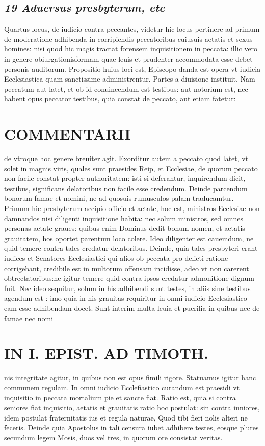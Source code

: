 \documentclass{article}
\begin{document}
\begin{pages}
\subsection*{\textit{19 Aduersus presbyterum, etc }}\pstart Quartus locus, de iudicio contra peccantes, videtur hic locus pertinere ad primum de moderatione adhibenda in corripiendis peccatoribus  cuiusuis aetatis et sexus homines: nisi quod hic magis tractat forensem inquisitionem in peccata: illic vero in genere obiurgationisformam quae leuis et prudenter accommodata esse debet personis auditorum.  \pend\pstart Propositio huius loci est, Episcopo danda est opera vt iudicia Ecclesiastica quam sanctissime administrentur.  \pend\pstart Partes a diuisione instituit. Nam peccatum aut latet, et ob id conuincendum est testibus: aut notorium est, nec habent opus peccator testibus, quia constat de peccato, aut etiam fatetur:  \pend
\section*{COMMENTARII }
\marginpar{[ p.134 ]}\pstart de vtroque hoc genere breuiter agit.  \pend\pstart Exorditur autem a peccato quod latet, vt solet in magnis viris, quales sunt praesides Reip, et Ecclesiae, de quorum peccato non facile constat propter authoritatem: isti si deferantur, inquirendum dicit, testibus, significans delatoribus non facile esse credendum. Deinde parcendum bonorum famae et nomini, ne ad quosuis rumusculos palam traducamtur. Primum hic presbyterum accipio officio et aetate, hoc est, ministros Ecclesiae non damnandos nisi diligenti inquisitione habita: nec solum ministros, sed omnes personas aetate graues: quibus  enim Dominus dedit bonum nomen, et aetatis grauitatem, hos oportet parentum loco colere. Ideo diligenter est cauemdum, ne quid temere contra tales credatur delatoribus. Deinde, quia tales presbyteri erant iudices et Senatores Ecclesiastici qui alios ob peccata pro delicti ratione corrigebant, credibile est in multorum offensam incidisse, adeo vt non carerent obtrectatoribus:ne igitur temere quid contra ipsos credatur admonitione dignum fuit. Nec ideo sequitur, solum in his adhibendi sunt testes, in aliis sine testibus agendum est : imo quia in his grauitas requiritur in omni iudicio Ecclesiastico eam esse adhibendam docet. Sunt interim multa leuia et puerilia in quibus nec de famae nec nomi\pend
\section*{IN I. EPIST. AD TIMOTH. }
\marginpar{[ p.135. ]}\pstart nis integritate agitur, in quibus non est opus fimili rigore. Statuamus igitur hanc communem regulam. In omni iudicio Ecclefiastico curandum est praesidi vt inquisitio in peccata mortalium pie et sancte fiat. Ratio est, quia si contra seniores fiat inquisitio, aetatis et grauitatis ratio hoc postulat: sin contra iuniores, idem postulat fraternitatis ius et regula naturae, Quod tibi fieri nolis alteri ne feceris.  \pend\pstart Deinde quia Apostolus in tali censura iubet adhibere testes, eosque plures secundum legem Mosis, duos vel tres, in quorum ore consistat veritas.  \pend
{}
{}

\end{pages}
\end{document}
